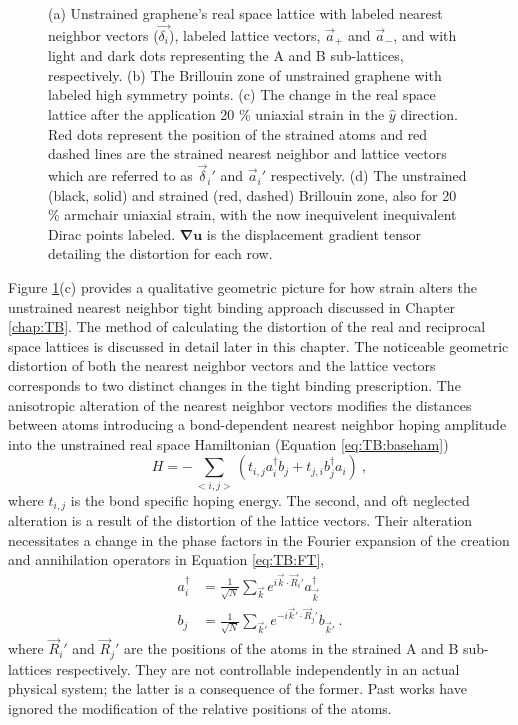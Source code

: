 \begin{figure}
  
  \caption{\label{fig:PVP:lattice} (a) Unstrained graphene's real space lattice with labeled nearest neighbor vectors ($\vec{\delta_i}$), labeled lattice vectors, $\vec{a}_+$ and  $\vec{a}_-$, and with light and dark dots representing the A and B sub-lattices, respectively. (b) The Brillouin zone of unstrained graphene with labeled high symmetry points. (c) The change in the real space lattice after the application 20 \% uniaxial strain in the $\hat{y}$ direction.  Red dots represent the position of the strained atoms and red dashed lines are the strained nearest neighbor and lattice vectors which are referred to as $\vec{\delta}_i'$ and $\vec{a}_i'$ respectively.  (d) The unstrained (black, solid) and strained (red, dashed) Brillouin zone, also for 20 \% armchair uniaxial strain, with the now inequivelent inequivalent Dirac points labeled.  $\bm{\nabla u}$ is the displacement gradient tensor detailing the distortion for each row.}
\end{figure}

Figure \ref{fig:PVP:lattice}(c) provides a qualitative geometric picture for how strain alters the unstrained nearest neighbor tight binding approach discussed in Chapter \ref{chap:TB}.
The method of calculating the distortion of the real and reciprocal space lattices is discussed in detail later in this chapter.
The noticeable geometric distortion of both the nearest neighbor vectors and the lattice vectors corresponds to two distinct changes in the tight binding prescription.
The anisotropic alteration of the nearest neighbor vectors modifies the distances between atoms introducing a bond-dependent nearest neighbor hoping amplitude into the unstrained real space Hamiltonian (Equation \ref{eq:TB:baseham}) \cite{Hasegawa2006}
\begin{equation}
  H=-\sum_{<i,j>} \left( t_{i,j} a_i^{\dagger} b_j + t_{j,i} b_j^{\dagger} a_i \right) \ ,
  \label{eq:PVP:RealSpace}
\end{equation}
where $t_{i,j}$ is the bond specific hoping energy.
The second, and oft neglected alteration is a result of the distortion of the lattice vectors.
Their alteration necessitates a change in the phase factors in the Fourier expansion of the creation and annihilation operators in Equation \ref{eq:TB:FT},
\begin{align}
  a_i^{\dagger}&=\frac{1}{\sqrt{N}}\sum_{\vec{k} } e^{ i \vec{k}  \cdot \vec{R}_i'} a_{\vec{k} }^{\dagger} \nonumber \\
  b_j          &=\frac{1}{\sqrt{N}}\sum_{\vec{k}'} e^{-i \vec{k}' \cdot \vec{R}_j'} b_{\vec{k}'} \ . \label{eq:PVP:FT} 
\end{align}
where $\vec{R}_i'$ and $\vec{R}_j'$ are the positions of the atoms in the strained A and B sub-lattices respectively.
They are not controllable independently in an actual physical system; the latter is a consequence of the former.
Past works have ignored the modification of the relative positions of the atoms.

